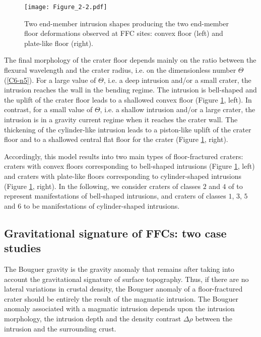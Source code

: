 \begin{figure}[h!]
  \graphicspath{ {/Users/thorey/Documents/These/Projet/FFC/Gravi_GRAIL/Article/Papier/Proof/} }
  \begin{center}

    \texttt{[image: Figure\_2-2.pdf]}
    \caption{Two  end-member   intrusion  shapes  producing   the  two
      end-member  floor deformations  observed  at  FFC sites:  convex
      floor (left) and plate-like floor (right).}
    \label{C6-Figure2-2}
  \end{center}
\end{figure}

The final morphology  of the crater floor depends mainly  on the ratio
between the  flexural wavelength and  the crater radius, i.e.   on the
dimensionless  number  $\Theta$  (\ref{C6-n5}).   For a  large  value  of
$\Theta$, i.e. a  deep intrusion and/or a small  crater, the intrusion
reaches the wall  in the bending regime. The  intrusion is bell-shaped
and the uplift  of the crater floor leads to  a shallowed convex floor
(Figure \ref{C6-Figure2-2},  left).  In  contrast, for  a small  value of
$\Theta$,  i.e.   a  shallow  intrusion and/or  a  large  crater,  the
intrusion is  in a gravity current  regime when it reaches  the crater
wall.   The  thickening of  the  cylinder-like  intrusion leads  to  a
piston-like uplift of the crater floor and to a shallowed central flat
floor for the crater (Figure \ref{C6-Figure2-2}, right).

Accordingly, this model results into two main types of floor-fractured
craters:  craters  with  convex floors  corresponding  to  bell-shaped
intrusions (Figure \ref{C6-Figure2-2}, left)  and craters with plate-like
floors   corresponding    to   cylinder-shaped    intrusions   (Figure
\ref{C6-Figure2-2},  right).  In  the following,  we consider  craters of
classes   $2$  and   $4$   of   \citet{Schultz:1976kt}  to   represent
manifestations of bell-shaped intrusions,  and craters of classes $1$,
$3$, $5$ and $6$ to be manifestations of cylinder-shaped intrusions.
 
\subsection{Gravitational signature of FFCs: two case studies}
\label{C6-sec:grav-sign-ffcs-1}

The Bouguer gravity  is the gravity anomaly that  remains after taking
into account the gravitational signature of surface topography.  Thus,
if there  are no  lateral variations in  crustal density,  the Bouguer
anomaly of a  floor-fractured crater should be entirely  the result of
the  magmatic  intrusion.   The  Bouguer  anomaly  associated  with  a
magmatic  intrusion   depends  upon  the  intrusion   morphology,  the
intrusion depth  and the  density contrast  $\Delta \rho$  between the
intrusion and the surrounding crust.

